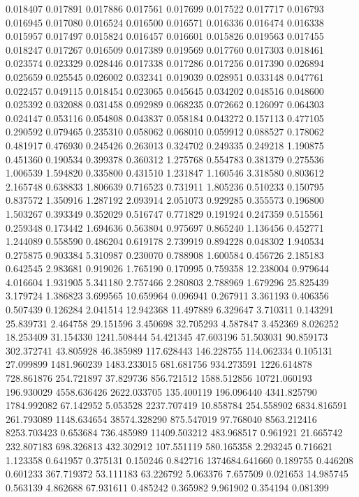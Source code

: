 0.018407
0.017891
0.017886
0.017561
0.017699
0.017522
0.017717
0.016793
0.016945
0.017080
0.016524
0.016500
0.016571
0.016336
0.016474
0.016338
0.015957
0.017497
0.015824
0.016457
0.016601
0.015826
0.019563
0.017455
0.018247
0.017267
0.016509
0.017389
0.019569
0.017760
0.017303
0.018461
0.023574
0.023329
0.028446
0.017338
0.017286
0.017256
0.017390
0.026894
0.025659
0.025545
0.026002
0.032341
0.019039
0.028951
0.033148
0.047761
0.022457
0.049115
0.018454
0.023065
0.045645
0.034202
0.048516
0.048600
0.025392
0.032088
0.031458
0.092989
0.068235
0.072662
0.126097
0.064303
0.024147
0.053116
0.054808
0.043837
0.058184
0.043272
0.157113
0.477105
0.290592
0.079465
0.235310
0.058062
0.068010
0.059912
0.088527
0.178062
0.481917
0.476930
0.245426
0.263013
0.324702
0.249335
0.249218
1.190875
0.451360
0.190534
0.399378
0.360312
1.275768
0.554783
0.381379
0.275536
1.006539
1.594820
0.335800
0.431510
1.231847
1.160546
3.318580
0.803612
2.165748
0.638833
1.806639
0.716523
0.731911
1.805236
0.510233
0.150795
0.837572
1.350916
1.287192
2.093914
2.051073
0.929285
0.355573
0.196800
1.503267
0.393349
0.352029
0.516747
0.771829
0.191924
0.247359
0.515561
0.259348
0.173442
1.694636
0.563804
0.975697
0.865240
1.136456
0.452771
1.244089
0.558590
0.486204
0.619178
2.739919
0.894228
0.048302
1.940534
0.275875
0.903384
5.310987
0.230070
0.788908
1.600584
0.456726
2.185183
0.642545
2.983681
0.919026
1.765190
0.170995
0.759358
12.238004
0.979644
4.016604
1.931905
5.341180
2.757466
2.280803
2.788969
1.679296
25.825439
3.179724
1.386823
3.699565
10.659964
0.096941
0.267911
3.361193
0.406356
0.507439
0.126284
2.041514
12.942368
11.497889
6.329647
3.710311
0.143291
25.839731
2.464758
29.151596
3.450698
32.705293
4.587847
3.452369
8.026252
18.253409
31.154330
1241.508444
54.421345
47.603196
51.503031
90.859173
302.372741
43.805928
46.385989
117.628443
146.228755
114.062334
0.105131
27.099899
1481.960239
1483.233015
681.681756
934.273591
1226.614878
728.861876
254.721897
37.829736
856.721512
1588.512856
10721.060193
196.930029
4558.636426
2622.033705
135.400119
196.096440
4341.825790
1784.992082
67.142952
5.053528
2237.707419
10.858784
254.558902
6834.816591
261.793089
1148.634654
38574.328290
875.547019
97.768040
8563.212416
8253.703423
0.653684
736.485989
11409.503212
483.968517
0.961921
21.665742
232.807183
698.326813
432.302912
107.551119
580.165358
2.293245
0.716621
1.123358
0.641957
0.375131
0.150246
0.842716
1374684.641660
0.189755
0.446208
0.601233
367.719372
53.111183
63.226792
5.063376
7.657509
0.021653
14.985745
0.563139
4.862688
67.931611
0.485242
0.365982
9.961902
0.354194
0.081399
